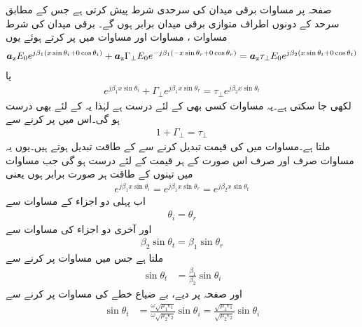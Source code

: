 صفحہ  پر مساوات  برقی میدان کی سرحدی شرط پیش کرتی ہے جس کے مطابق سرحد کے دونوں اطراف متوازی برقی میدان برابر ہوں گے۔ برقی میدان کی شرط مساوات ، مساوات  اور  مساوات  میں  پر کرتے ہوئے یوں
\begin{align*}
{\boldsymbol{a}}_{\textup{z}} E_0 e^{j\beta_1 (x\sin \theta_i +0 \cos \theta_i)} +{\boldsymbol{a}}_{\textup{z}} \Gamma_{\perp} E_0 e^{- j \beta_1 (-x \sin \theta_r+0\cos \theta_r)} ={\boldsymbol{a}}_{\textup{z}} \tau_{\perp} E_0 e^{j \beta_2 (x \sin \theta_t+0\cos \theta_t)}
\end{align*}
یا  
\begin{align}\label{مساوات_ترچھی_انعکاسی-شرط_الف}
e^{j\beta_1 x\sin \theta_i} +\Gamma_{\perp}  e^{ j \beta_1 x \sin \theta_r} = \tau_{\perp}  e^{j \beta_2 x \sin \theta_t} 
\end{align}
لکھی جا سکتی ہے۔یہ مساوات کسی بھی  کے لئے درست ہے لہٰذا یہ  کے لئے بھی درست ہو گی۔اس میں  پر کرنے سے
 \begin{align}\label{مساوات_ترچھی_انعکاسی-شرط_ب}
1+\Gamma_{\perp}=\tau_{\perp}
\end{align}
ملتا ہے۔مساوات  میں  کی قیمت تبدیل کرنے سے  کے طاقت تبدیل ہوتے ہیں۔یوں یہ مساوات صرف اور صرف اس صورت  کے ہر قیمت کے لئے درست ہو گی جب مساوات میں تینوں  کے طاقت ہر صورت برابر ہوں یعنی 
\begin{align}
e^{j\beta_1 x\sin \theta_i}=e^{j \beta_1 x \sin \theta_r}=e^{j \beta_2 x \sin \theta_t}
\end{align}
اب پہلی دو اجزاء کے مساوات سے
\begin{align}\label{مساوات_ترچھی_زاویہ_آمد_برابر_زاویہ_انعکاس}
\theta_i=\theta_r
\end{align}
اور آخری دو اجزاء کی مساوات سے
\begin{align}\label{مساوات_ترچھی_ابن_سھل_الف}
\beta_2 \sin \theta_t= \beta_1\sin \theta_r
\end{align}
ملتا ہے جس میں مساوات  پر کرنے سے
\begin{align*}
\sin \theta_t&= \frac{\beta_1}{\beta_2}\sin \theta_i 
\end{align*}
اور صفحہ  پر دیے، بے ضیاع خطے کی مساوات  پر کرنے سے
\begin{align}\label{مساوات_ترچھی_ابن_سھل_پہلی_مساوات}
\sin \theta_t &=\frac{\omega \sqrt{\mu_1 \epsilon_1}}{\omega \sqrt{\mu_2 \epsilon_2 }}\sin \theta_i =\frac{\sqrt{\mu_1 \epsilon_1}}{\sqrt{\mu_2 \epsilon_2 }}\sin \theta_i 
\end{align}
